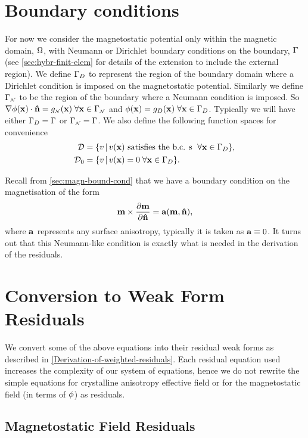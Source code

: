 \section{Boundary conditions}
\label{sec:galerkin-bound-cond}

For now we consider the magnetostatic potential only within the magnetic domain, $\Omega$, with Neumann or Dirichlet boundary conditions on the boundary, ${\Gamma}$ (see \autoref{sec:hybr-finit-elem} for details of the extension to include the external region). We define ${\Gamma}_D$ to represent the region of the boundary domain where a Dirichlet condition is imposed on the magnetostatic potential. Similarly we define ${\Gamma}_{\scriptscriptstyle{\mathcal{N}}}$ to be the region of the boundary where a Neumann condition is imposed. So $ \nabla \phi(\mathbf{x}) \cdot \mathbf{\hat{n}} = g_{\scriptscriptstyle{\mathcal{N}}}(\mathbf{x}) \; \forall \mathbf{x} \in {\Gamma}_{\scriptscriptstyle{\mathcal{N}}}$ and $\phi(\mathbf{x}) = g_D(\mathbf{x}) \; \forall \mathbf{x} \in {\Gamma}_D$. Typically we will have either ${\Gamma}_D = {\Gamma}$ or ${\Gamma}_{\scriptscriptstyle{\mathcal{N}}} = {\Gamma}$. We also define the following function spaces for convenience
\begin{align}
  \label{eq:037}
  \mathcal{D} & = \{ v \,|\, v(\mathbf{x}) \text{ satisfies the b.c. s } \; \forall \mathbf{x} \in {\Gamma}_D \}, \\
  \mathcal{D}_0 &= \{ v \,|\, v(\mathbf{x}) = 0 \; \forall \mathbf{x} \in {\Gamma}_D \}.
\end{align}

Recall from \autoref{sec:magn-bound-cond} that we have a boundary condition on the magnetisation of the form
\begin{equation}
  \label{eq:m-bc}
  \mathbf{m} \times \frac{\partial \mathbf{m}}{\partial \mathbf{\hat{n}}} = {\mathbf{a}}(\mathbf{m}, \mathbf{\hat{n}}),
\end{equation}
where ${\mathbf{a}}$ represents any surface anisotropy, typically it is taken as ${\mathbf{a}} \equiv 0$.
It turns out that this Neumann-like condition is exactly what is needed in the derivation of the residuals.


\section{Conversion to Weak Form Residuals}

We convert some of the above equations into their residual weak forms as described in \autoref{Derivation-of-weighted-residuals}.
Each residual equation used increases the complexity of our system of equations, hence we do not rewrite the simple equations for crystalline anisotropy effective field or for the magnetostatic field (in terms of $\phi$) as residuals.


\subsection{Magnetostatic Field Residuals}
\label{sec:magn-field-resid}

